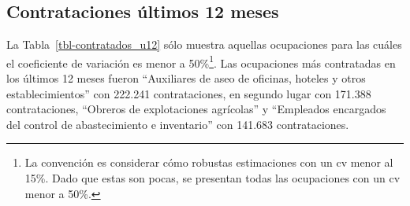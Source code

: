 \documentclass[
  11pt,
]{article}
\begin{document}
\begin{table}

\caption{\label{tbl-dotacion_resumen}Dotación actual de las empresas
segpun tipo de relación contractual}


\end{table}%

\FloatBarrier

\subsection{Contrataciones últimos 12
meses}\label{contrataciones-uxfaltimos-12-meses}

La Tabla~\ref{tbl-contratados_u12} sólo muestra aquellas ocupaciones
para las cuáles el coeficiente de variación es menor a 50\%\footnote{La
  convención es considerar cómo robustas estimaciones con un cv menor al
  15\%. Dado que estas son pocas, se presentan todas las ocupaciones con
  un cv menor a 50\%.}. Las ocupaciones más contratadas en los últimos
12 meses fueron ``Auxiliares de aseo de oficinas, hoteles y otros
establecimientos'' con 222.241 contrataciones, en segundo lugar con
171.388 contrataciones, ``Obreros de explotaciones agrícolas'' y
``Empleados encargados del control de abastecimiento e inventario'' con
141.683 contrataciones. \FloatBarrier
\end{document}
